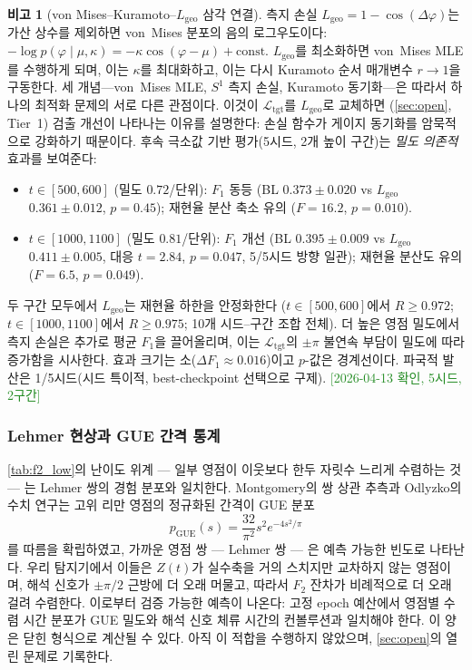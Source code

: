 \documentclass[11pt, a4paper]{article}
\theoremstyle{definition}
\newtheorem{remark}{비고}[section]
\theoremstyle{plain}
\newcommand{\Ltgt}{\mathcal{L}_{\mathrm{tgt}}}
\begin{document}
\begin{remark}[von Mises--Kuramoto--$L_{\mathrm{geo}}$ 삼각 연결]
\label{rem:triangle}
측지 손실 $L_{\mathrm{geo}} = 1 - \cos(\Delta\varphi)$는
가산 상수를 제외하면 von~Mises 분포의 음의 로그우도이다:
$-\log p(\varphi \mid \mu,\kappa)
  = -\kappa\cos(\varphi-\mu) + \mathrm{const}$.
$L_{\mathrm{geo}}$를 최소화하면 von~Mises MLE를 수행하게 되며,
이는 $\kappa$를 최대화하고, 이는 다시 Kuramoto
순서 매개변수 $r \to 1$을 구동한다. 세 개념---von~Mises MLE,
$S^1$ 측지 손실, Kuramoto 동기화---은 따라서 하나의
최적화 문제의 서로 다른 관점이다. 이것이
$\Ltgt$를 $L_{\mathrm{geo}}$로 교체하면
(\cref{sec:open}, Tier~1) 검출 개선이 나타나는 이유를
설명한다: 손실 함수가 게이지 동기화를 암묵적으로
강화하기 때문이다.
후속 극소값 기반 평가(5시드, 2개 높이 구간)는
\emph{밀도 의존적} 효과를 보여준다:
\begin{itemize}
  \item \textbf{$t\in[500,600]$} (밀도 $0.72$/단위):
    $F_1$ 동등 (BL $0.373\pm0.020$ vs $L_{\mathrm{geo}}$
    $0.361\pm0.012$, $p{=}0.45$);
    재현율 분산 축소 유의
    ($F{=}16.2$, $p{=}0.010$).
  \item \textbf{$t\in[1000,1100]$} (밀도 $0.81$/단위):
    $F_1$ 개선 (BL $0.395\pm0.009$ vs $L_{\mathrm{geo}}$
    $0.411\pm0.005$, 대응 $t{=}2.84$, $p{=}0.047$,
    5/5시드 방향 일관);
    재현율 분산도 유의 ($F{=}6.5$, $p{=}0.049$).
\end{itemize}
두 구간 모두에서 $L_{\mathrm{geo}}$는 재현율 하한을
안정화한다 ($t\in[500,600]$에서 $R\ge 0.972$;
$t\in[1000,1100]$에서 $R\ge 0.975$; 10개
시드--구간 조합 전체).
더 높은 영점 밀도에서 측지 손실은 추가로 평균 $F_1$을
끌어올리며, 이는 $\Ltgt$의 $\pm\pi$ 불연속 부담이
밀도에 따라 증가함을 시사한다.
효과 크기는 소($\Delta F_1 \approx 0.016$)이고
$p$-값은 경계선이다.
파국적 발산은 1/5시드(시드 특이적, best-checkpoint
선택으로 구제).
\textcolor{ForestGreen}{[2026-04-13 확인, 5시드, 2구간]}
\end{remark}

\subsubsection{Lehmer 현상과 GUE 간격 통계}
\label{sec:lehmer_gue}

\cref{tab:f2_low}의 난이도 위계 --- 일부 영점이 이웃보다 한두 자릿수 느리게 수렴하는 것 --- 는 Lehmer 쌍의 경험 분포와 일치한다. Montgomery의 쌍 상관 추측과 Odlyzko의 수치 연구는 고위 리만 영점의 정규화된 간격이 GUE 분포
\begin{equation}\label{eq:gue}
  p_{\mathrm{GUE}}(s) = \frac{32}{\pi^2}s^2 e^{-4s^2/\pi}
\end{equation}
를 따름을 확립하였고, 가까운 영점 쌍 --- Lehmer 쌍 --- 은 예측 가능한 빈도로 나타난다. 우리 탐지기에서 이들은 $Z(t)$가 실수축을 거의 스치지만 교차하지 않는 영점이며, 해석 신호가 $\pm\pi/2$ 근방에 더 오래 머물고, 따라서 $F_2$ 잔차가 비례적으로 더 오래 걸려 수렴한다. 이로부터 검증 가능한 예측이 나온다: 고정 epoch 예산에서 영점별 수렴 시간 분포가 GUE 밀도와 해석 신호 체류 시간의 컨볼루션과 일치해야 한다. 이 양은 닫힌 형식으로 계산될 수 있다. 아직 이 적합을 수행하지 않았으며, \cref{sec:open}의 열린 문제로 기록한다.
\end{document}
